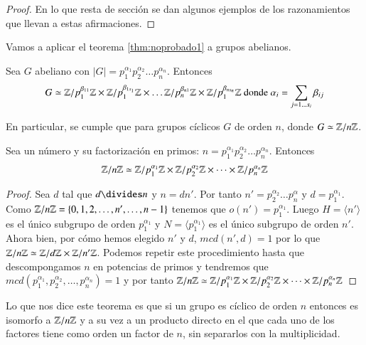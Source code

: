 \begin{proof}
	En lo que resta de sección se dan algunos ejemplos de los razonamientos que llevan a estas afirmaciones.
\end{proof}

Vamos a aplicar el teorema \ref{thm:noprobado1} a grupos abelianos.

\begin{thm}
	Sea $G$ abeliano con $|G| = p_1^{\alpha_1}p_2^{\alpha_2}\dots p_n^{\alpha_n}$. Entonces
	\begin{align}
	G \simeq \mathbb{Z}/p_1^{\beta_{11}}\mathbb{Z} \times \mathbb{Z}/p_1^{\beta_{1s_1}}\mathbb{Z} \times \dots \mathbb{Z}/p_n^{\beta_{n1}}\mathbb{Z} \times \mathbb{Z}/p_1^{\beta_{ns_n}}\mathbb{Z} \text{ donde } \alpha_i = \sum_{j = 1\dots s_i} \beta_{ij}
	\end{align}
\end{thm}

En particular, se cumple que para grupos cíclicos $G$ de orden $n$, donde $G \simeq \mathbb{Z}/n\mathbb{Z}$.

\begin{thm}
	\label{thm:znzisomproductodirecto}
	Sea un número y su factorización en primos: $n = p_1^{\alpha_1}p_2^{\alpha_2}\dots p_n^{\alpha_n}$. Entonces
	\begin{align}
	\mathbb{Z}/n\mathbb{Z} \simeq \mathbb{Z}/p_1^{\alpha_1}\mathbb{Z} \times \mathbb{Z}/p_2^{\alpha_2}\mathbb{Z} \times \dots \times \mathbb{Z}/p_n^{\alpha_n}\mathbb{Z}
	\end{align}
\end{thm}

\begin{proof}
	Sea $d$ tal que $d \divides n$ y $n = dn'$. Por tanto $n' = p_2^{\alpha_2}\dots p_n^{\alpha}$ y $d = p_1^{\alpha_1}$. Como $\mathbb{Z}/n\mathbb{Z} = \{0, 1, 2, \dots, n', \dots, n-1\}$ tenemos que $o(n') = p_1^{\alpha_1}$. Luego $H = \langle n' \rangle$ es el único subgrupo de orden $p_1^{\alpha_1}$ y $N = \langle p_1^{\alpha_1} \rangle$ es el único subgrupo de orden $n'$. Ahora bien, por cómo hemos elegido $n'$ y $d$, $mcd(n', d) = 1$ por lo que $\mathbb{Z}/n\mathbb{Z} \simeq \mathbb{Z}/d\mathbb{Z} \times \mathbb{Z}/n'\mathbb{Z}$. Podemos repetir este procedimiento hasta que descompongamos $n$ en potencias de primos y tendremos que $mcd(p_1^{\alpha_1}, p_2^{\alpha_2}, \dots, p_n^{\alpha_n}) = 1$ y por tanto $\mathbb{Z}/n\mathbb{Z} \simeq \mathbb{Z}/p_1^{\alpha_1}\mathbb{Z} \times \mathbb{Z}/p_2^{\alpha_2}\mathbb{Z} \times \dots \times \mathbb{Z}/p_n^{\alpha_n}\mathbb{Z}$
\end{proof}

Lo que nos dice este teorema es que si un grupo es cíclico de orden $n$ entonces es isomorfo a $\mathbb{Z}/n\mathbb{Z}$ y a su vez a un producto directo en el que cada uno de los factores tiene como orden un factor de $n$, sin separarlos con la multiplicidad.

